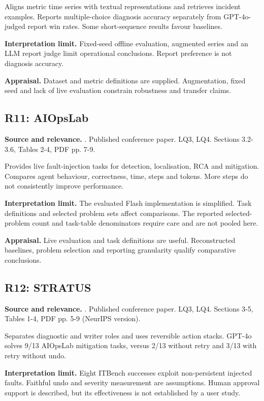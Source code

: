 Aligns metric time series with textual representations and retrieves incident examples. Reports multiple-choice diagnosis accuracy separately from GPT-4o-judged report win rates. Some short-sequence results favour baselines.

\noindent\textbf{Interpretation limit.} Fixed-seed offline evaluation, augmented series and an LLM report judge limit operational conclusions. Report preference is not diagnosis accuracy.

\noindent\textbf{Appraisal.} Dataset and metric definitions are supplied. Augmentation, fixed seed and lack of live evaluation constrain robustness and transfer claims.

\subsection{R11: AIOpsLab}
\noindent\textbf{Source and relevance.} \parencite{chen2025aiopslab}. Published conference paper. LQ3, LQ4. Sections 3.2-3.6, Tables 2-4, PDF pp. 7-9.

Provides live fault-injection tasks for detection, localisation, RCA and mitigation. Compares agent behaviour, correctness, time, steps and tokens. More steps do not consistently improve performance.

\noindent\textbf{Interpretation limit.} The evaluated Flash implementation is simplified. Task definitions and selected problem sets affect comparisons. The reported selected-problem count and task-table denominators require care and are not pooled here.

\noindent\textbf{Appraisal.} Live evaluation and task definitions are useful. Reconstructed baselines, problem selection and reporting granularity qualify comparative conclusions.

\subsection{R12: STRATUS}
\noindent\textbf{Source and relevance.} \parencite{chen2025stratus}. Published conference paper. LQ3, LQ4. Sections 3-5, Tables 1-4, PDF pp. 5-9 (NeurIPS version).

Separates diagnostic and writer roles and uses reversible action stacks. GPT-4o solves 9/13 AIOpsLab mitigation tasks, versus 2/13 without retry and 3/13 with retry without undo.

\noindent\textbf{Interpretation limit.} Eight ITBench successes exploit non-persistent injected faults. Faithful undo and severity measurement are assumptions. Human approval support is described, but its effectiveness is not established by a user study.

